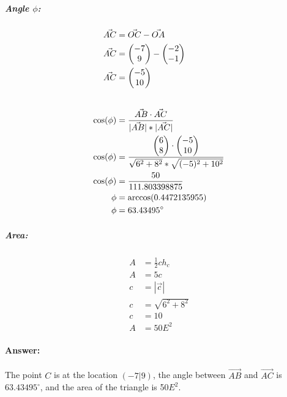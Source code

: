 \subparagraph{Angle $\phi$:}
\begin{align}
    \vec{AC} &= \vec{OC} - \vec{OA} \\
    \vec{AC} &= \begin{pmatrix} -7 \\ 9 \end{pmatrix} - \begin{pmatrix} -2 \\ -1 \end{pmatrix} \\
    \vec{AC} &= \begin{pmatrix} -5 \\ 10 \end{pmatrix} \\[20pt]
    \cos(\phi) &= \frac{\vec{AB} \cdot \vec{AC}}{|\vec{AB}| * |\vec{AC}|} \\
    \cos(\phi) &= \frac{\begin{pmatrix} 6 \\ 8 \end{pmatrix} \cdot \begin{pmatrix} -5 \\ 10 \end{pmatrix}}{\sqrt{6^2 + 8^2} * \sqrt{(-5)^2 + 10^2}} \\
    \cos(\phi) &= \frac{50}{111.803398875} \\
    \phi &= \arccos(0.4472135955) \\
    \phi &= 63.43495^\circ
\end{align}

\subparagraph{Area:}
\begin{align}
    A &= \frac{1}{2}ch_c \\
    A &= 5c \\[20pt]
    c &= |\vec{c}| \\
    c &= \sqrt{6^2 + 8^2} \\
    c &= 10 \\[20pt]
    A &= 50E^2
\end{align}

\paragraph{Answer:}
The point $C$ is at the location $(-7|9)$, the angle between $\vec{AB}$ and $\vec{AC}$ is 
$63.43495^\circ$, and the area of the triangle is 50$E^2$. 
